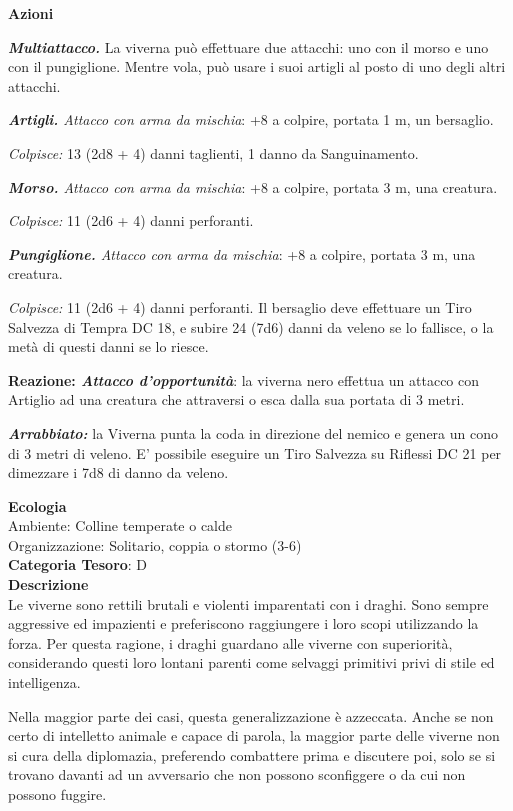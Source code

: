\begin{multicols}{2}
{\textbf{Azioni}

\emph{\textbf{Multiattacco.}} La viverna può effettuare due attacchi: uno con il morso e uno con il pungiglione. Mentre vola, può usare i suoi artigli al posto di uno degli altri attacchi.

\emph{\textbf{Artigli.} Attacco con arma da mischia}: +8 a colpire, portata 1 m, un bersaglio.

\emph{Colpisce:} 13 (2d8 + 4) danni taglienti, 1 danno da Sanguinamento.

\emph{\textbf{Morso.} Attacco con arma da mischia}: +8 a colpire, portata 3 m, una creatura.

\emph{Colpisce:} 11 (2d6 + 4) danni perforanti.

\emph{\textbf{Pungiglione.} Attacco con arma da mischia}: +8 a colpire, portata 3 m, una creatura.

\emph{Colpisce:} 11 (2d6 + 4) danni perforanti. Il bersaglio deve effettuare un Tiro Salvezza di Tempra DC 18, e subire 24 (7d6) danni da veleno se lo fallisce, o la metà di questi danni se lo riesce.

\textbf{Reazione: \emph{Attacco d'opportunità}}: la viverna nero effettua un attacco con Artiglio ad una creatura che attraversi o esca dalla sua portata di 3 metri.

\emph{\textbf{Arrabbiato:}} la Viverna punta la coda in direzione del nemico e genera un cono di 3 metri di veleno. E' possibile eseguire un Tiro Salvezza su Riflessi DC 21 per dimezzare i 7d8 di danno da veleno.

\textbf{Ecologia}\\
Ambiente: Colline temperate o calde\\
Organizzazione: Solitario, coppia o stormo (3-6)\\
\textbf{Categoria Tesoro}: D\\
\textbf{Descrizione}\\
Le viverne sono rettili brutali e violenti imparentati con i draghi. Sono sempre aggressive ed impazienti e preferiscono raggiungere i loro scopi utilizzando la forza. Per questa ragione, i draghi guardano alle viverne con superiorità, considerando questi loro lontani parenti come selvaggi primitivi privi di stile ed intelligenza.

Nella maggior parte dei casi, questa generalizzazione è azzeccata. Anche se non certo di intelletto animale e capace di parola, la maggior parte delle viverne non si cura della diplomazia, preferendo combattere prima e discutere poi, solo se si trovano davanti ad un avversario che non possono sconfiggere o da cui non possono fuggire.

}
\end{multicols}
